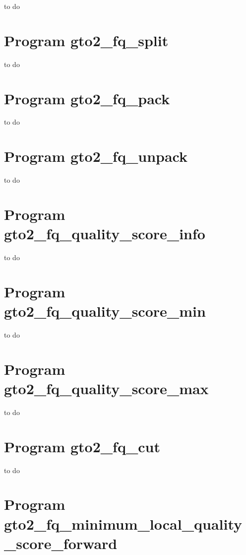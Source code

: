 \documentclass[11pt,]{krantz}
\begin{document}
to do

\section{Program gto2\_fq\_split}\label{program-gto2_fq_split}

to do

\section{Program gto2\_fq\_pack}\label{program-gto2_fq_pack}

to do

\section{Program gto2\_fq\_unpack}\label{program-gto2_fq_unpack}

to do

\section{Program
gto2\_fq\_quality\_score\_info}\label{program-gto2_fq_quality_score_info}

to do

\section{Program
gto2\_fq\_quality\_score\_min}\label{program-gto2_fq_quality_score_min}

to do

\section{Program
gto2\_fq\_quality\_score\_max}\label{program-gto2_fq_quality_score_max}

to do

\section{Program gto2\_fq\_cut}\label{program-gto2_fq_cut}

to do

\section{Program
gto2\_fq\_minimum\_local\_quality\_score\_forward}\label{program-gto2_fq_minimum_local_quality_score_forward}
\end{document}
